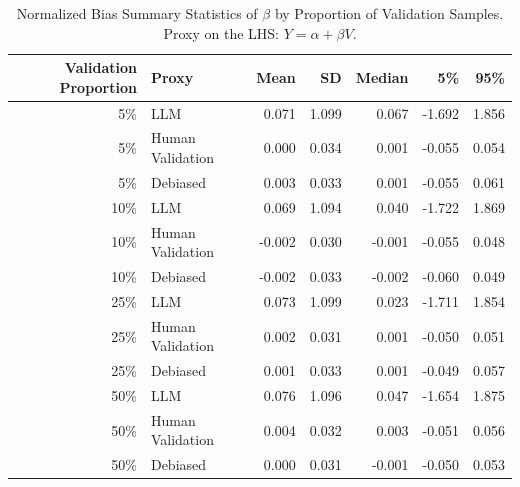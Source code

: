 \begin{table}

\caption{Normalized Bias Summary Statistics of $\beta$ by Proportion of Validation Samples. Proxy on the LHS: $Y = \alpha + \beta V$.}
\centering
\begin{tabular}[t]{rlrrrrr}
\toprule
Validation Proportion & Proxy & Mean & SD & Median & 5\% & 95\%\\
\midrule
5\% & LLM & 0.071 & 1.099 & 0.067 & -1.692 & 1.856\\
5\% & Human Validation & 0.000 & 0.034 & 0.001 & -0.055 & 0.054\\
5\% & Debiased & 0.003 & 0.033 & 0.001 & -0.055 & 0.061\\
10\% & LLM & 0.069 & 1.094 & 0.040 & -1.722 & 1.869\\
10\% & Human Validation & -0.002 & 0.030 & -0.001 & -0.055 & 0.048\\
10\% & Debiased & -0.002 & 0.033 & -0.002 & -0.060 & 0.049\\
25\% & LLM & 0.073 & 1.099 & 0.023 & -1.711 & 1.854\\
25\% & Human Validation & 0.002 & 0.031 & 0.001 & -0.050 & 0.051\\
25\% & Debiased & 0.001 & 0.033 & 0.001 & -0.049 & 0.057\\
50\% & LLM & 0.076 & 1.096 & 0.047 & -1.654 & 1.875\\
50\% & Human Validation & 0.004 & 0.032 & 0.003 & -0.051 & 0.056\\
50\% & Debiased & 0.000 & 0.031 & -0.001 & -0.050 & 0.053\\
\bottomrule
\end{tabular}
\end{table}
